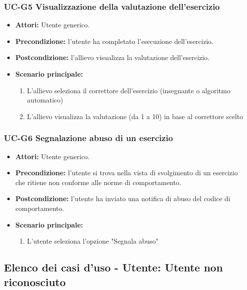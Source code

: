 	\subsubsection{UC-G5 Visualizzazione della valutazione dell'esercizio}
	\begin{itemize}
			\item \textbf{Attori:} Utente generico.
			\item \textbf{Precondizione:} l'utente ha completato l'esecuzione dell'esercizio.
			\item \textbf{Postcondizione:} l'allievo visualizza la valutazione dell'esercizio.
			\item \textbf{Scenario principale:}
				\begin{enumerate}
					\item L'allievo seleziona il correttore dell'esercizio (insegnante o algoritmo automatico)
					\item L'allievo visualizza la valutazione (da 1 a 10) in base al correttore scelto
				\end{enumerate}
	\end{itemize}				

\subsubsection{UC-G6 Segnalazione abuso di un esercizio}
	\begin{itemize}
		\item \textbf{Attori:} Utente generico.
		\item \textbf{Precondizione:} l'utente si trova nella vista di svolgimento di un esercizio che ritiene non conforme alle norme di comportamento.
		\item \textbf{Postcondizione:} l'utente ha inviato una notifica di abuso del codice di comportamento.
		\item \textbf{Scenario principale:}
		\begin{enumerate}
			\item L'utente seleziona l'opzione "Segnala abuso"
		\end{enumerate}
	\end{itemize}
	
	

\subsection{Elenco dei casi d'uso - Utente: Utente non riconosciuto}

